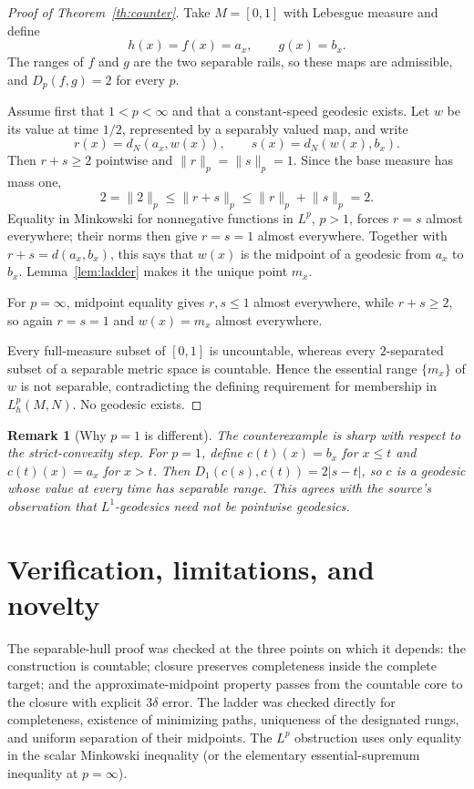 \documentclass[11pt]{article}
\newtheorem{remark}[theorem]{Remark}
\newcommand{\Dp}{D_p}
\begin{document}
\begin{proof}[Proof of Theorem~\ref{th:counter}]
Take $M=[0,1]$ with Lebesgue measure and define
\[
 h(x)=f(x)=a_x,\qquad g(x)=b_x.
\]
The ranges of $f$ and $g$ are the two separable rails, so these maps are
admissible, and $\Dp(f,g)=2$ for every $p$.

Assume first that $1<p<\infty$ and that a constant-speed geodesic exists.
Let $w$ be its value at time $1/2$, represented by a separably valued map, and
write
\[
 r(x)=d_N(a_x,w(x)),\qquad s(x)=d_N(w(x),b_x).
\]
Then $r+s\geq2$ pointwise and
$\lVert r\rVert_p=\lVert s\rVert_p=1$.  Since the base measure has mass one,
\[
 2=\lVert2\rVert_p
 \leq\lVert r+s\rVert_p
 \leq\lVert r\rVert_p+\lVert s\rVert_p=2.
\]
Equality in Minkowski for nonnegative functions in $L^p$, $p>1$, forces
$r=s$ almost everywhere; their norms then give $r=s=1$ almost everywhere.
Together with $r+s=d(a_x,b_x)$, this says that $w(x)$ is the midpoint of a
geodesic from $a_x$ to $b_x$.  Lemma~\ref{lem:ladder} makes it the unique
point $m_x$.

For $p=\infty$, midpoint equality gives $r,s\leq1$ almost everywhere, while
$r+s\geq2$, so again $r=s=1$ and $w(x)=m_x$ almost everywhere.

Every full-measure subset of $[0,1]$ is uncountable, whereas every
$2$-separated subset of a separable metric space is countable.  Hence the
essential range $\{m_x\}$ of $w$ is not separable, contradicting the defining
requirement for membership in $L^p_h(M,N)$.  No geodesic exists.
\end{proof}

\begin{remark}[Why $p=1$ is different]
The counterexample is sharp with respect to the strict-convexity step.  For
$p=1$, define $c(t)(x)=b_x$ for $x\leq t$ and $c(t)(x)=a_x$ for $x>t$.
Then $D_1(c(s),c(t))=2|s-t|$, so $c$ is a geodesic whose value at every time
has separable range.  This agrees with the source's observation that
$L^1$-geodesics need not be pointwise geodesics.
\end{remark}

\section{Verification, limitations, and novelty}

The separable-hull proof was checked at the three points on which it depends:
the construction is countable; closure preserves completeness inside the
complete target; and the approximate-midpoint property passes from the
countable core to the closure with explicit $3\delta$ error.  The ladder was
checked directly for completeness, existence of minimizing paths, uniqueness
of the designated rungs, and uniform separation of their midpoints.  The
$L^p$ obstruction uses only equality in the scalar Minkowski inequality (or
the elementary essential-supremum inequality at $p=\infty$).
\end{document}
